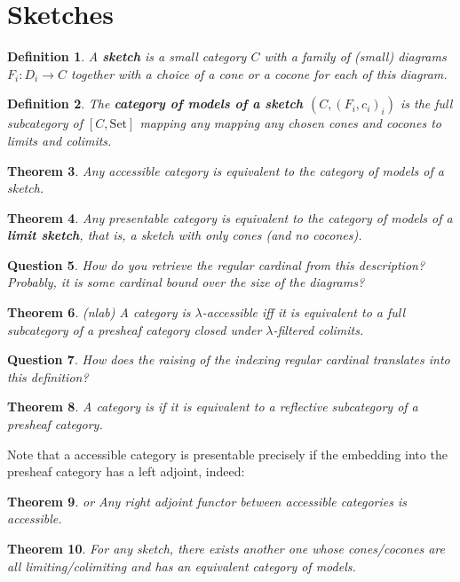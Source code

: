 \documentclass{article}
\newcommand{\Set}{\text{Set}}
\newtheorem{theorem}{Theorem}[section]
\newtheorem{definition}[theorem]{Definition}
\newtheorem{question}[theorem]{Question}
\begin{document}
\section{Sketches}
\begin{definition}
 A \textbf{sketch} is a small category $C$ with a family of (small) diagrams $F_i : D_i
 \to C$ together with a choice of a cone or a cocone for each of this diagram.
\end{definition}
\begin{definition}
  The \textbf{category of models of a sketch $(C,(F_i,c_i)_i)$} is the full
  subcategory of $[C,\Set]$ mapping any mapping any chosen cones and cocones to
  limits and colimits.
\end{definition}
\begin{theorem}
 Any accessible category is equivalent to the category of models of a sketch.
\end{theorem}
\begin{theorem}
 Any presentable category is equivalent to the category of models of a
 \textbf{limit sketch}, that is, a sketch with only cones (and no cocones).
\end{theorem}
\begin{question}
 How do you retrieve the regular cardinal from this description? Probably, it is
some cardinal bound over the size of the diagrams?
\end{question}
\begin{theorem}
  (nlab)
 A  category is $\lambda$-accessible iff it is equivalent to a full subcategory
 of a presheaf category closed under $\lambda$-filtered colimits.
\end{theorem}
\begin{question}
  How does the raising of the indexing regular cardinal translates into this definition?
\end{question}
\begin{theorem}
 A category is if it is equivalent to a reflective subcategory
 of a presheaf category.
\end{theorem}
Note that a accessible category is presentable
precisely if the embedding into the presheaf category has a left adjoint, indeed:
\begin{theorem}\cite[Proposition 2.4.8]{accessible} or \cite[2.23]{adamek_rosicky}
  Any right adjoint functor between accessible categories is accessible.
\end{theorem}
\begin{theorem}
  \cite[Corollary 2.62]{adamek_rosicky}
  For any sketch, there exists another one whose cones/cocones are all
  limiting/colimiting and has an equivalent category of models.
\end{theorem}
\end{document}

